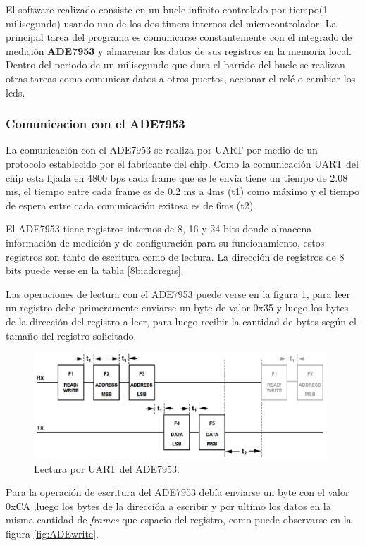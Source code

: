 El software realizado consiste en un bucle infinito controlado por tiempo(1 milisegundo) usando uno de los dos timers internos del microcontrolador. La principal tarea del programa es comunicarse constantemente con el integrado de medición \textbf{ADE7953} y almacenar los datos de sus registros en la memoria local. Dentro del periodo de un milisegundo que dura el barrido del bucle se realizan otras tareas como comunicar datos a otros puertos, accionar el relé o cambiar los leds.

\subsubsection{Comunicacion con el ADE7953}

La comunicación con el ADE7953 se realiza por UART por medio de un protocolo establecido por el fabricante del chip. Como la comunicación UART del chip esta fijada en 4800 bps cada frame que se le envía tiene un tiempo de 2.08 ms, el tiempo entre cada frame es de 0.2 ms a 4ms (t1) como máximo y el tiempo de espera entre cada comunicación exitosa es de 6ms (t2).

El ADE7953 tiene registros internos de 8, 16 y 24 bits donde almacena información de medición y de configuración para su funcionamiento, estos registros son tanto de escritura como de lectura. La dirección  de registros de 8 bits puede verse en la tabla \ref{8biadcregis}.

Las operaciones de lectura con el ADE7953 puede verse en la figura \ref{fig:ADEread}, para leer un registro debe primeramente enviarse un byte de valor 0x35 y luego los bytes de la dirección del registro a leer, para luego recibir la cantidad de bytes según el tamaño del registro solicitado.

\begin{figure}[htb]
	\centering
	\includegraphics[width=110mm,keepaspectratio]{Figures/ade7uartread.png}
	\caption{Lectura por UART del ADE7953.}
	\label{fig:ADEread}
\end{figure}

Para la operación de escritura del ADE7953 debía enviarse un byte con el valor 0xCA ,luego los bytes de la dirección a escribir y por ultimo los datos en la misma cantidad de \textit{frames} que espacio del registro, como puede observarse en la figura \ref{fig:ADEwrite}.

